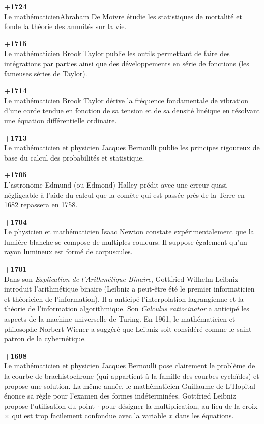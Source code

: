 \textbf{+1724}\\
Le mathématicienAbraham De Moivre étudie les statistiques de mortalité et fonde la théorie des annuités sur la vie.

\textbf{+1715}\\
Le mathématicien Brook Taylor publie les outils permettant de faire des intégrations par parties ainsi que des développements en série de fonctions (les fameuses séries de Taylor).

\textbf{+1714}\\
Le mathématicien Brook Taylor dérive la fréquence fondamentale de vibration d'une corde tendue en fonction de sa tension et de sa densité linéique en résolvant une équation différentielle ordinaire.

\textbf{+1713}\\
Le mathématicien et physicien Jacques Bernoulli publie les principes rigoureux de base du calcul des probabilités et statistique.

\textbf{+1705}\\
L'astronome Edmund (ou Edmond) Halley prédit avec une erreur quasi négligeable à l'aide du calcul que la comète qui est passée près de la Terre en 1682 repassera en 1758.

\textbf{+1704}\\
Le physicien et mathématicien Isaac Newton constate expérimentalement que la lumière blanche se compose de multiples couleurs. Il suppose également qu'un rayon lumineux est formé de corpuscules.

\textbf{+1701}\\
Dans son \textit{Explication de l'Arithmétique Binaire}, Gottfried Wilhelm Leibniz introduit l'arithmétique binaire (Leibniz a peut-être été le premier informaticien et théoricien de l'information). Il a anticipé l'interpolation lagrangienne et la théorie de l'information algorithmique. Son \textit{Calculus ratiocinator} a anticipé les aspects de la machine universelle de Turing. En 1961, le mathématicien et philosophe Norbert Wiener a suggéré que Leibniz soit considéré comme le saint patron de la cybernétique.

\textbf{+1698}\\
Le mathématicien et physicien Jacques Bernoulli pose clairement le problème de la courbe de brachistochrone (qui appartient à la famille des courbes cycloïdes) et propose une solution. La même année, le mathématicien Guillaume de L'Hopital énonce sa règle pour l'examen des formes indéterminées. Gottfried Leibniz propose l'utilisation du point $\cdot$ pour désigner la multiplication, au lieu de la croix $\times$ qui est trop facilement confondue avec la variable $x$ dans les équations.

